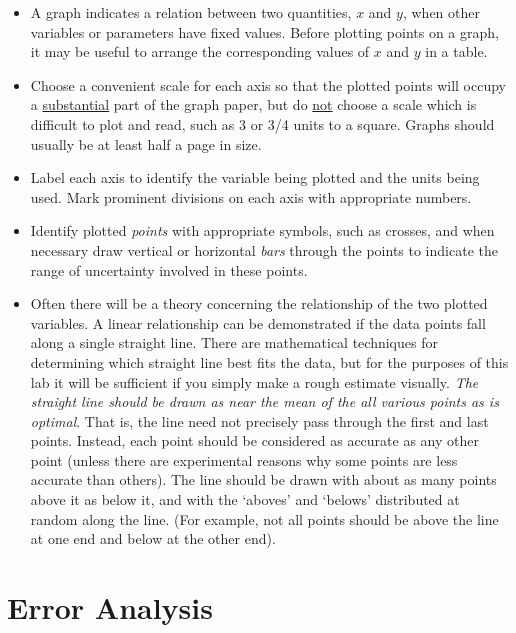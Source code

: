 \begin{itemize}
    \item A graph indicates a relation between two quantities, $x$ and $y$, when other variables or parameters have fixed values.  Before plotting points on a graph, it may be useful to arrange the corresponding values of $x$ and $y$ in a table.

    \item Choose a convenient scale for each axis so that the plotted points will occupy a \underline{substantial} part of the graph paper, but do \underline{not} choose a scale which is difficult to plot and read, such as 3 or 3/4 units to a square.  Graphs should usually be at least half a page in size.

    \item Label each axis to identify the variable being plotted and the units being used.  Mark prominent divisions on each axis with appropriate numbers.

    \item Identify plotted \emph{points} with appropriate symbols, such as crosses, and when necessary draw vertical or horizontal \emph{bars} through the points to indicate the range of uncertainty involved in these points.

    \item Often there will be a theory concerning the relationship of the two plotted variables.  A linear relationship can be demonstrated if the data points fall along a single straight line.  There are mathematical techniques for determining which straight line best fits the data, but for the purposes of this lab it will be sufficient if you simply make a rough estimate visually.  \emph{The straight line should be drawn as near the mean of the all various points as is optimal}.  That is, the line need not precisely pass through the first and last points.  Instead, each point should be considered as accurate as any other point (unless there are experimental reasons why some points are less accurate than others).  The line should be drawn with about as many points above it as below it, and with the `aboves' and `belows' distributed at random along the line.  (For example, not all points should be above the line at one end and below at the other end).
\end{itemize}

\section{Error Analysis}

